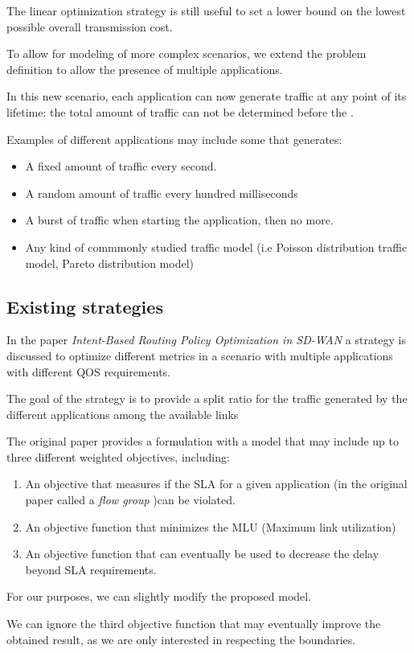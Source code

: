 \documentclass{article}
\begin{document}
The linear optimization strategy is still useful to set a lower bound on the lowest possible overall transmission cost.

To allow for modeling of more complex scenarios, we extend the problem definition to allow the presence of multiple applications.

In this new scenario, each application can now generate traffic at any point of its lifetime: the total amount of traffic can not be determined before the .

Examples of different applications may include some that generates:
\begin{itemize}
	\item A fixed amount of traffic every second.
	\item A random amount of traffic every hundred milliseconds
	\item A burst of traffic when starting the application, then no more.
	\item Any kind of commmonly studied traffic model (i.e Poisson distribution traffic model, Pareto distribution model)
\end{itemize}

\pagebreak

\subsection{Existing strategies}

In the paper \textit{Intent-Based Routing Policy Optimization in SD-WAN} a strategy is discussed to optimize different metrics in a scenario with multiple applications with different QOS requirements.

The goal of the strategy is to provide a split ratio for the traffic generated by the different applications among the available links

The original paper provides a formulation with a model that may include up to three different weighted objectives, including:

\begin{enumerate}
	\item An objective that measures if the SLA for a given application (in the original paper called a \textit{flow group} )can be violated.
	\item An objective function that minimizes the MLU (Maximum link utilization)
	\item An objective function that can eventually be used to decrease the delay beyond SLA requirements.
\end{enumerate}

For our purposes, we can slightly modify the proposed model.

We can ignore the third objective function that may eventually improve the obtained result, as we are only interested in respecting the boundaries.
\end{document}
